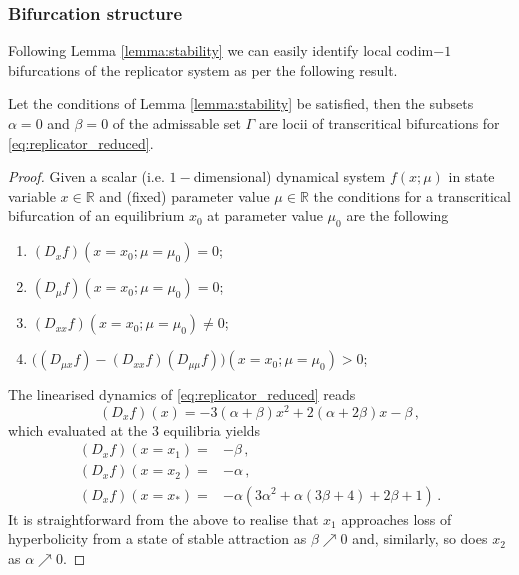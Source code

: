 \documentclass[../main.tex]{subfiles}
\begin{document}
\subsubsection{Bifurcation structure}\label{subsubsec:bifurcations}

Following Lemma \ref{lemma:stability} we can easily identify local codim$-1$ bifurcations of the replicator system as per the following result.

\begin{theorem}[label=thm:bifurcations]{}{}
     Let the conditions of Lemma \ref{lemma:stability} be satisfied, then the subsets $\alpha=0$ and $\beta=0$ of the admissable set $\Gamma$ are locii of transcritical bifurcations for \eqref{eq:replicator_reduced}. 
\end{theorem}

\begin{proof}
     Given a scalar (i.e. $1-$dimensional) dynamical system $f(x;\mu)$ in state variable $x\in \mathbb{R}$ and (fixed) parameter value $\mu\in \mathbb{R}$ the conditions for a transcritical bifurcation of an equilibrium $x_{0}$ at parameter value $\mu_{0}$ are the following
     \begin{enumerate}
             \item $(D_{x}f)(x=x_{0};\mu=\mu_{0}) = 0$;
             \item $(D_{\mu}f)(x=x_{0};\mu=\mu_{0}) = 0$;
             \item $(D_{xx}f)(x=x_{0};\mu=\mu_{0}) \neq 0$;
             \item $\bigg((D_{\mu x}f) - (D_{xx}f)(D_{\mu\mu}f)\bigg)(x=x_{0};\mu=\mu_{0}) > 0$;
     \end{enumerate}
     The linearised dynamics of \eqref{eq:replicator_reduced} reads
     \begin{equation*}
             (D_{x}f)(x) = -3(\alpha + \beta)x^{2} + 2(\alpha + 2 \beta)x - \beta\,, 
     \end{equation*}
     which evaluated at the $3$ equilibria yields
     \begin{align*}
             (D_{x}f)(x=x_{1}) =& -\beta\,, \\
             (D_{x}f)(x=x_{2}) =& -\alpha\,, \\
             (D_{x}f)(x=x_{*}) =& -\alpha(3 \alpha^{2} + \alpha(3 \beta + 4) + 2 \beta + 1)\,.
     \end{align*}
     It is straightforward from the above to realise that $x_{1}$ approaches loss of hyperbolicity from a state of stable attraction as $\beta\nearrow0$ and, similarly, so does $x_{2}$ as $\alpha\nearrow0$.

\end{proof}
\end{document}
